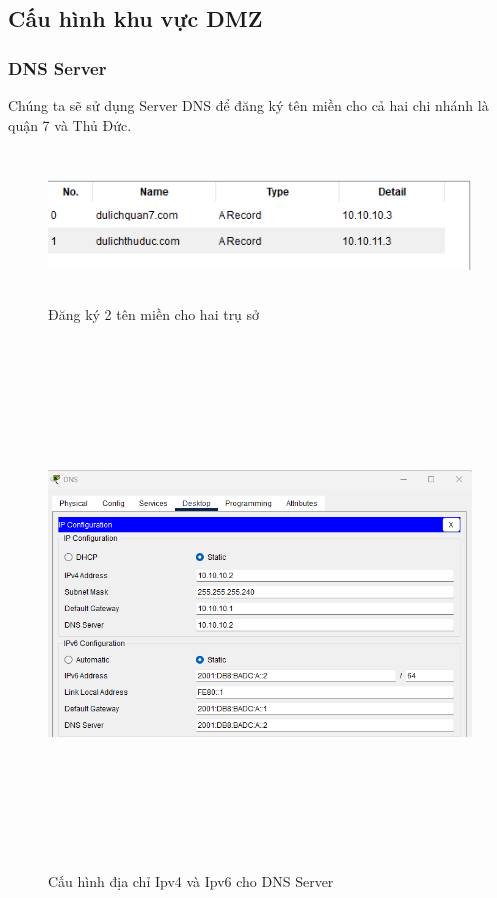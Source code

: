 \documentclass[a4paper, 12pt]{article}
\begin{document}
\subsection{Cấu hình khu vực DMZ }
\subsubsection{DNS Server}
\hspace*{0.25cm}Chúng ta sẽ sử dụng Server DNS để đăng ký tên miền cho cả hai chi nhánh là quận 7 và Thủ Đức.\\
\begin{figure}[H]
    \centering
    \includegraphics[width=16cm, height=4cm]{img/4.4.1a.png}
    \caption{Đăng ký 2 tên miền cho hai trụ sở}
    \label{hinh441a}
\end{figure}
\begin{figure}[H]
    \centering
    \includegraphics[width=17cm, height=14cm]{img/4.1.1b.png}
    \caption{Cấu hình địa chỉ Ipv4 và Ipv6 cho DNS Server}
    \label{hinh441b}
\end{figure}
\end{document}
